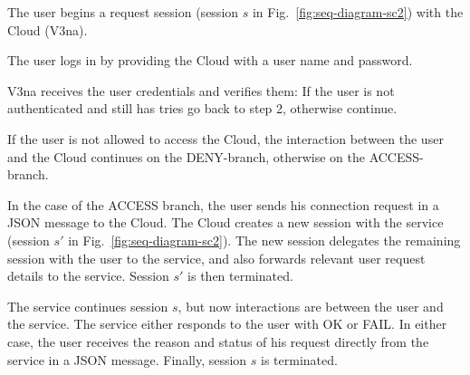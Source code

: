 \documentclass[10pt]{llncs}
\begin{document}
\begin{compactenum}
\item  The user begins a request session (session $s$ in Fig.~\ref{fig:seq-diagram-sc2}) with the Cloud (V3na).

\item  The user logs in by providing the Cloud with a user name and password.

\item  V3na receives the user credentials and verifies them: If the user is not authenticated and still has tries %
go back to step 2, otherwise continue.

\item  If the user is not allowed to access the Cloud, the interaction between the user and the Cloud continues on the DENY-branch, otherwise on the ACCESS-branch.

\item  In the case of the ACCESS branch, the user sends his connection request in a JSON message to the Cloud. The Cloud creates a new session with the service (session $s'$ in Fig.~\ref{fig:seq-diagram-sc2}). The new session delegates the remaining session with the user to the service, and also forwards relevant user request details to the service. Session $s'$ is then terminated.

\item  The service continues session $s$, but now interactions are between the user and the service. The service either responds to the user with OK or FAIL. In either case, the user receives the reason and status of his request directly from the service in a JSON message. Finally, session $s$ is terminated.
\end{compactenum}
\end{document}
